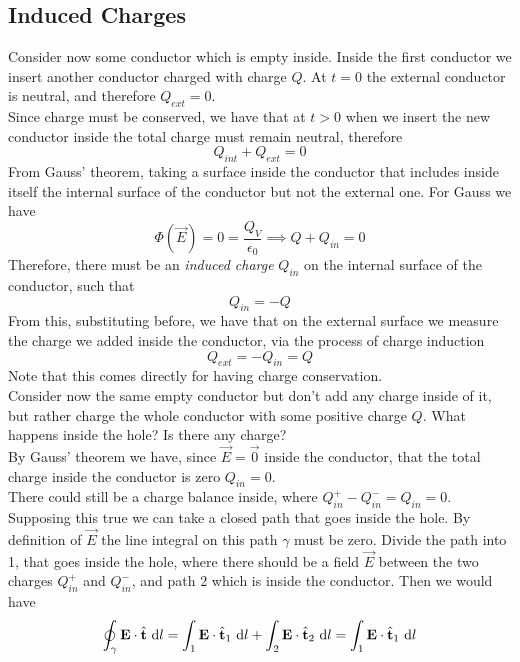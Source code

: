 \documentclass[../electromagnetism]{subfiles}
\begin{document}
\subsection{Induced Charges}
Consider now some conductor which is empty inside. Inside the first conductor we insert another conductor charged with charge $Q$. At $t=0$ the external conductor is neutral, and therefore $Q_{ext}=0$.\\
Since charge must be conserved, we have that at $t>0$ when we insert the new conductor inside the total charge must remain neutral, therefore
\begin{equation*}
	Q_{int}+Q_{ext}=0
\end{equation*}
From Gauss' theorem, taking  a surface inside the conductor that includes inside itself the internal surface of the conductor but not the external one. For Gauss we have
\begin{equation*}
	\Phi(\vec{E})=0=\frac{Q_V}{\epsilon_0}\implies Q+Q_{in}=0
\end{equation*}
Therefore, there must be an \textit{induced charge} $Q_{in}$ on the internal surface of the conductor, such that
\begin{equation}
	Q_{in}=-Q
	\label{eq:inducedcharge}
\end{equation}
From this, substituting before, we have that on the external surface we measure the charge we added inside the conductor, via the process of charge induction
\begin{equation}
	Q_{ext}=-Q_{in}=Q
	\label{eq:chargemeas}
\end{equation}
Note that this comes directly for having charge conservation.\\
Consider now the same empty conductor but don't add any charge inside of it, but rather charge the whole conductor with some positive charge $Q$. What happens inside the hole? Is there any charge?\\
By Gauss' theorem we have, since $\vec{E}=\vec{0}$ inside the conductor, that the total charge inside the conductor is zero $Q_{in}=0$.\\
There could still be a charge balance inside, where $Q_{in}^+-Q_{in}^-=Q_{in}=0$. Supposing this true we can take a closed path that goes inside the hole. By definition of $\vec{E}$ the line integral on this path $\gamma$ must be zero. Divide the path into 1, that goes inside the hole, where there should be a field $\vec{E}$ between the two charges $Q_{in}^+$ and $Q_{in}^-$, and path 2 which is inside the conductor. Then we would have
\begin{equation*}
	\oint_\gamma\mathbf{E}\cdot\hat{\mathbf{t}}\ \mathrm{d} l=\int_1\mathbf{E}\cdot\hat{\mathbf{t}}_1\ \mathrm{d} l+\int_2\mathbf{E}\cdot\hat{\mathbf{t}}_2\ \mathrm{d} l=\int_1\mathbf{E}\cdot\hat{\mathbf{t}}_1\ \mathrm{d} l
\end{equation*}
\end{document}
